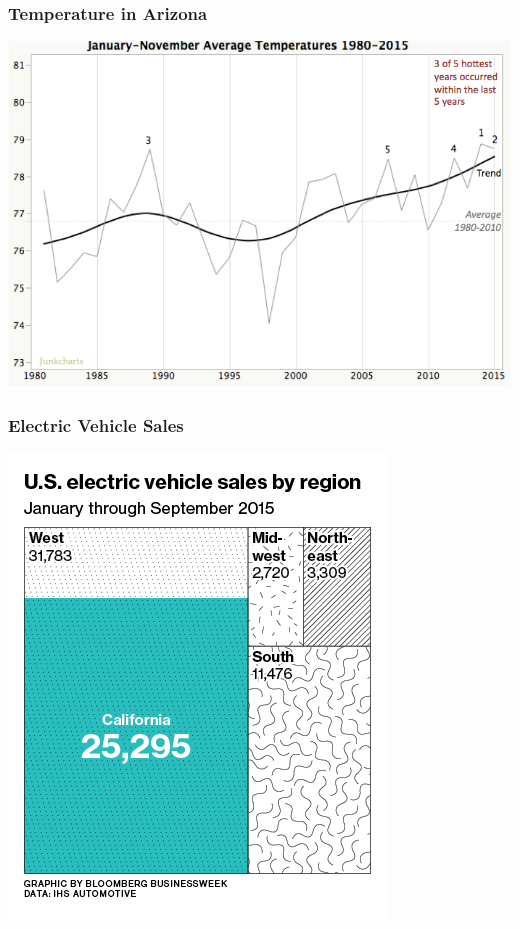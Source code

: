 \documentclass{beamer} %
\begin{document}
\begin{frame}\frametitle{Temperature in Arizona}
	\centering
	\includegraphics[width=0.9\linewidth]{temp2.png}
\end{frame}


\begin{frame}\frametitle{Electric Vehicle Sales}
	\centering
	\includegraphics[width=0.66\linewidth]{electric.png}
\end{frame}
\end{document}
